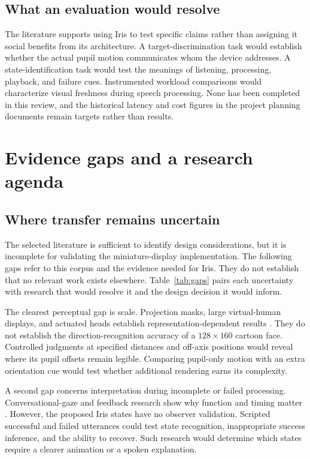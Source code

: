 \documentclass[journal]{IEEEtran}
\begin{document}
\subsection{What an evaluation would resolve}
The literature supports using Iris to test specific claims rather than assigning it social benefits from its architecture. A target-discrimination task would establish whether the actual pupil motion communicates whom the device addresses. A state-identification task would test the meanings of listening, processing, playback, and failure cues. Instrumented workload comparisons would characterize visual freshness during speech processing. None has been completed in this review, and the historical latency and cost figures in the project planning documents remain targets rather than results.

\section{Evidence gaps and a research agenda}
\subsection{Where transfer remains uncertain}
The selected literature is sufficient to identify design considerations, but it is incomplete for validating the miniature-display implementation. The following gaps refer to this corpus and the evidence needed for Iris. They do not establish that no relevant work exists elsewhere. Table~\ref{tab:gaps} pairs each uncertainty with research that would resolve it and the design decision it would inform.

The clearest perceptual gap is scale. Projection masks, large virtual-human displays, and actuated heads establish representation-dependent results \cite{almoubayed2012,jung2023,mirror2025}. They do not establish the direction-recognition accuracy of a $128\times160$ cartoon face. Controlled judgments at specified distances and off-axis positions would reveal where its pupil offsets remain legible. Comparing pupil-only motion with an extra orientation cue would test whether additional rendering earns its complexity.

A second gap concerns interpretation during incomplete or failed processing. Conversational-gaze and feedback research show why function and timing matter \cite{andrist2014,axelsson2022}. However, the proposed Iris states have no observer validation. Scripted successful and failed utterances could test state recognition, inappropriate success inference, and the ability to recover. Such research would determine which states require a clearer animation or a spoken explanation.
\end{document}
